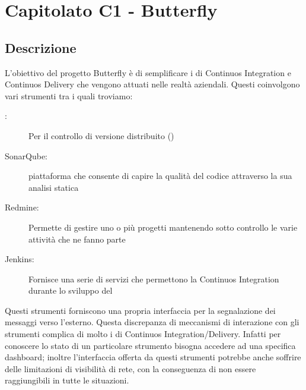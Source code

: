\clearpage
\section{Capitolato C1 - Butterfly}
\label{sec:c1}
	\subsection{Descrizione}
	L'obiettivo del progetto Butterfly è di semplificare i  di Continuos Integration e Continuos Delivery che vengono attuati nelle realtà aziendali.
Questi  coinvolgono vari strumenti  tra i quali troviamo:
 	\begin{description}
 		\item[:] Per il controllo di versione distribuito ()
 		\item[SonarQube:] piattaforma che consente di capire la qualità del codice attraverso la sua analisi statica
 		\item[Redmine:] Permette di gestire uno o più progetti mantenendo sotto controllo le varie attività che ne fanno parte
 		\item[Jenkins:] Fornisce una serie di servizi che permettono la Continuos Integration durante lo sviluppo del 
 	\end{description}
 	
 	Questi strumenti forniscono una propria interfaccia per la segnalazione dei messaggi verso l'esterno. Questa discrepanza di meccanismi di interazione con gli strumenti
complica di molto i  di Continuos Integration/Delivery. Infatti per conoscere lo stato di un particolare strumento bisogna
accedere ad una specifica dashboard; inoltre l'interfaccia offerta da questi strumenti potrebbe anche soffrire
delle limitazioni di visibilità di rete, con la conseguenza di non essere raggiungibili in tutte le situazioni.

